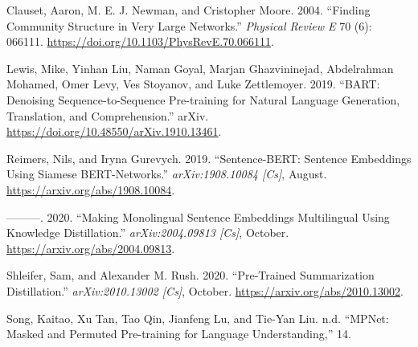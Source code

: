 \documentclass{article}
\newlength{\cslhangindent}
\newlength{\cslentryspacingunit} %
\newenvironment{CSLReferences}[2] %
 {%
  \setlength{\parindent}{0pt}
  \ifodd #1
  \let\oldpar\par
  \def\par{\hangindent=\cslhangindent\oldpar}
  \fi
  \setlength{\parskip}{#2\cslentryspacingunit}
 }%
 {}
\begin{document}
\hypertarget{refs}{}
\begin{CSLReferences}{1}{0}
\leavevmode{}%
Clauset, Aaron, M. E. J. Newman, and Cristopher Moore. 2004. {``Finding
Community Structure in Very Large Networks.''} \emph{Physical Review E}
70 (6): 066111. \url{https://doi.org/10.1103/PhysRevE.70.066111}.

\leavevmode{}%
Lewis, Mike, Yinhan Liu, Naman Goyal, Marjan Ghazvininejad, Abdelrahman
Mohamed, Omer Levy, Ves Stoyanov, and Luke Zettlemoyer. 2019. {``{BART}:
{Denoising Sequence-to-Sequence Pre-training} for {Natural Language
Generation}, {Translation}, and {Comprehension}.''} {arXiv}.
\url{https://doi.org/10.48550/arXiv.1910.13461}.

\leavevmode{}%
Reimers, Nils, and Iryna Gurevych. 2019. {``Sentence-{BERT}: {Sentence
Embeddings} Using {Siamese BERT-Networks}.''} \emph{arXiv:1908.10084
{[}Cs{]}}, August. \url{https://arxiv.org/abs/1908.10084}.

\leavevmode{}%
---------. 2020. {``Making {Monolingual Sentence Embeddings
Multilingual} Using {Knowledge Distillation}.''} \emph{arXiv:2004.09813
{[}Cs{]}}, October. \url{https://arxiv.org/abs/2004.09813}.

\leavevmode{}%
Shleifer, Sam, and Alexander M. Rush. 2020. {``Pre-Trained
{Summarization Distillation}.''} \emph{arXiv:2010.13002 {[}Cs{]}},
October. \url{https://arxiv.org/abs/2010.13002}.

\leavevmode{}%
Song, Kaitao, Xu Tan, Tao Qin, Jianfeng Lu, and Tie-Yan Liu. n.d.
{``{MPNet}: {Masked} and {Permuted Pre-training} for {Language
Understanding},''} 14.

\end{CSLReferences}



\end{document}
